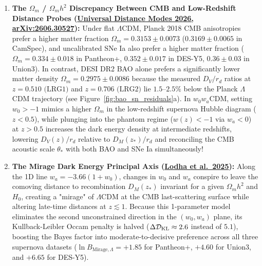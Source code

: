 \documentclass[11pt,letterpaper]{article}
\begin{document}
\begin{enumerate}
    \setlength{\itemsep}{4pt}
    \item \textbf{The $\Omega_m$ / $\Omega_m h^2$ Discrepancy Between CMB and Low-Redshift Distance Probes (\href{https://arxiv.org/pdf/2606.30527}{Universal Distance Modes 2026, arXiv:2606.30527}):} Under flat $\Lambda$CDM, Planck 2018 CMB anisotropies prefer a higher matter fraction $\Omega_m = 0.3153 \pm 0.0073$ ($0.3169 \pm 0.0065$ in CamSpec), and uncalibrated SNe Ia also prefer a higher matter fraction ($\Omega_m = 0.334 \pm 0.018$ in Pantheon+, $0.352 \pm 0.017$ in DES-Y5, $0.36 \pm 0.03$ in Union3). In contrast, DESI DR2 BAO alone prefers a significantly lower matter density $\Omega_m = 0.2975 \pm 0.0086$ because the measured $D_V/r_d$ ratios at $z = 0.510\text{ (LRG1)}$ and $z = 0.706\text{ (LRG2)}$ lie $1.5\text{--}2.5\%$ below the Planck $\Lambda$CDM trajectory (see Figure~\ref{fig:bao_sn_residuals}a). In $w_0 w_a$CDM, setting $w_0 > -1$ mimics a higher $\Omega_m$ in the low-redshift supernova Hubble diagram ($z < 0.5$), while plunging into the phantom regime ($w(z) < -1$ via $w_a < 0$) at $z > 0.5$ increases the dark energy density at intermediate redshifts, lowering $D_V(z)/r_d$ relative to $D_M(z_*)/r_d$ and reconciling the CMB acoustic scale $\theta_*$ with both BAO and SNe Ia simultaneously!
    \item \textbf{The Mirage Dark Energy Principal Axis (\href{https://arxiv.org/abs/2503.14743}{Lodha et al.\ 2025}):} Along the 1D line $w_a = -3.66(1 + w_0)$, changes in $w_0$ and $w_a$ conspire to leave the comoving distance to recombination $D_M(z_*)$ invariant for a given $\Omega_m h^2$ and $H_0$, creating a "mirage" of $\Lambda$CDM at the CMB last-scattering surface while altering late-time distances at $z \lesssim 1$. Because this 1-parameter model eliminates the second unconstrained direction in the $(w_0, w_a)$ plane, its Kullback-Leibler Occam penalty is halved ($\Delta\mathcal{D}_{\rm KL} \approx 2.6$ instead of $5.1$), boosting the Bayes factor into moderate-to-decisive preference across all three supernova datasets ($\ln B_{\text{Mirage},\Lambda} = +1.85$ for Pantheon+, $+4.60$ for Union3, and $+6.65$ for DES-Y5).

\end{enumerate}
\end{document}
